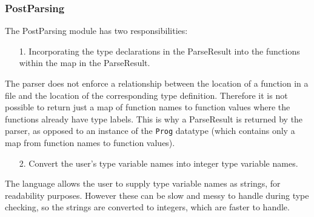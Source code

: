 \documentclass{article}
\begin{document}
\subsubsection{PostParsing}
The PostParsing module has two responsibilities:
\begin{enumerate}
    \item[1.] Incorporating the type declarations in the ParseResult into the functions within the map in the ParseResult.
\end{enumerate}
\indent The parser does not enforce a relationship between the location of a function in a file and the location of the corresponding type definition. Therefore it is not possible to return just a map of function names to function values where the functions already have type labels. This is why a ParseResult is returned by the parser, as opposed to an instance of the \texttt{Prog} datatype (which contains only a map from function names to function values).
\begin{enumerate}
    \item[2.] Convert the user's type variable names into integer type variable names.
\end{enumerate}
\indent The language allows the user to supply type variable names as strings, for readability purposes. However these can be slow and messy to handle during type checking, so the strings are converted to integers, which are faster to handle.
\end{document}
